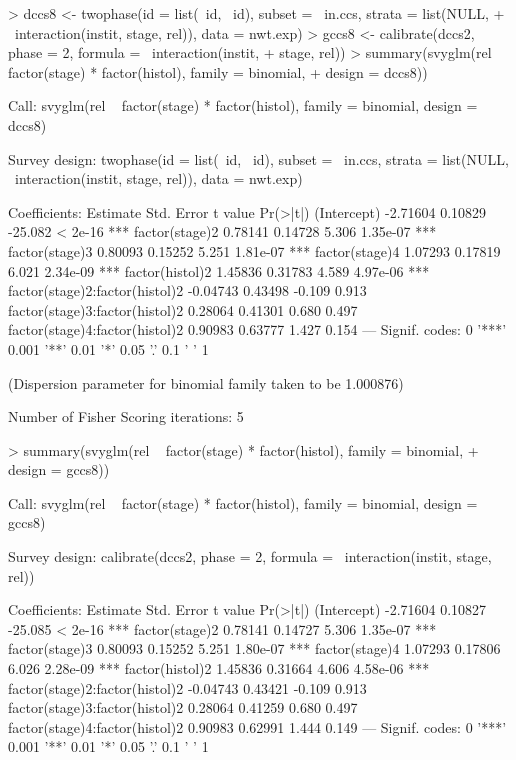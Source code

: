 \documentclass{article}
\begin{document}
\begin{Schunk}
\begin{Sinput}
> dccs8 <- twophase(id = list(~id, ~id), subset = ~in.ccs, strata = list(NULL, 
+     ~interaction(instit, stage, rel)), data = nwt.exp)
> gccs8 <- calibrate(dccs2, phase = 2, formula = ~interaction(instit, 
+     stage, rel))
> summary(svyglm(rel ~ factor(stage) * factor(histol), family = binomial, 
+     design = dccs8))
\end{Sinput}
\begin{Soutput}
Call:
svyglm(rel ~ factor(stage) * factor(histol), family = binomial, 
    design = dccs8)

Survey design:
twophase(id = list(~id, ~id), subset = ~in.ccs, strata = list(NULL, 
    ~interaction(instit, stage, rel)), data = nwt.exp)

Coefficients:
                               Estimate Std. Error t value Pr(>|t|)    
(Intercept)                    -2.71604    0.10829 -25.082  < 2e-16 ***
factor(stage)2                  0.78141    0.14728   5.306 1.35e-07 ***
factor(stage)3                  0.80093    0.15252   5.251 1.81e-07 ***
factor(stage)4                  1.07293    0.17819   6.021 2.34e-09 ***
factor(histol)2                 1.45836    0.31783   4.589 4.97e-06 ***
factor(stage)2:factor(histol)2 -0.04743    0.43498  -0.109    0.913    
factor(stage)3:factor(histol)2  0.28064    0.41301   0.680    0.497    
factor(stage)4:factor(histol)2  0.90983    0.63777   1.427    0.154    
---
Signif. codes:  0 '***' 0.001 '**' 0.01 '*' 0.05 '.' 0.1 ' ' 1 

(Dispersion parameter for binomial family taken to be 1.000876)

Number of Fisher Scoring iterations: 5
\end{Soutput}
\begin{Sinput}
> summary(svyglm(rel ~ factor(stage) * factor(histol), family = binomial, 
+     design = gccs8))
\end{Sinput}
\begin{Soutput}
Call:
svyglm(rel ~ factor(stage) * factor(histol), family = binomial, 
    design = gccs8)

Survey design:
calibrate(dccs2, phase = 2, formula = ~interaction(instit, stage, 
    rel))

Coefficients:
                               Estimate Std. Error t value Pr(>|t|)    
(Intercept)                    -2.71604    0.10827 -25.085  < 2e-16 ***
factor(stage)2                  0.78141    0.14727   5.306 1.35e-07 ***
factor(stage)3                  0.80093    0.15252   5.251 1.80e-07 ***
factor(stage)4                  1.07293    0.17806   6.026 2.28e-09 ***
factor(histol)2                 1.45836    0.31664   4.606 4.58e-06 ***
factor(stage)2:factor(histol)2 -0.04743    0.43421  -0.109    0.913    
factor(stage)3:factor(histol)2  0.28064    0.41259   0.680    0.497    
factor(stage)4:factor(histol)2  0.90983    0.62991   1.444    0.149    
---
Signif. codes:  0 '***' 0.001 '**' 0.01 '*' 0.05 '.' 0.1 ' ' 1 


\end{Soutput}
\end{Schunk}
\end{document}
